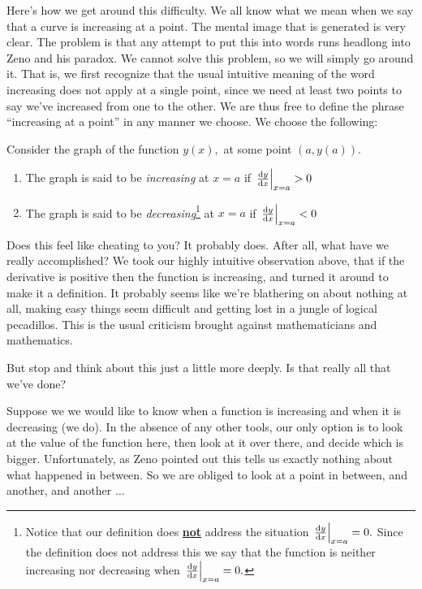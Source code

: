 Here's how we get around this difficulty. We all know what we mean
when we say that a curve is increasing at a point. The mental image
that is generated is very clear. The problem is that any attempt to
put this into words runs headlong into Zeno and his paradox. We cannot
solve this problem, so we will simply go around it. That is, we first
recognize that the usual intuitive meaning of the word increasing does
not apply at a single point, since we need at least two points to say
we've increased from one to the other.  We are thus free to define the
phrase ``increasing at a point'' in any manner we choose. We choose
the following:
\begin{definition}{}
  Consider the graph of the function $y(x),$ at some point $(a, y(a)).$
  \begin{enumerate}
  \item The graph is said to be \emph{increasing} at $x=a$ if $\left.{}\frac{\text{d}{y}}{\text{d}{x}}\right|_{x=a} > 0$
  \item The graph is said to be \emph{decreasing}\footnote{Notice that
      our definition does \underline{\bf{}not} address the situation
      $\left.{}\frac{\text{d}{y}}{\text{d}{x}}\right|_{x=a}=0.$ Since the definition does not address
      this we say that the function is neither increasing nor
      decreasing when $\left.{}\frac{\text{d}{y}}{\text{d}{x}}\right|_{x=a}=0.$ } at $x=a$ if
    $\left.{}\frac{\text{d}{y}}{\text{d}{x}}\right|_{x=a} < 0$
  \end{enumerate}
  \label{def:first-deriv-test}
\end{definition}


Does this feel like cheating to you? It probably does.  After all,
what have we really accomplished? We took our highly intuitive
observation above, that if the derivative is positive then the
function is increasing, and turned it around to make it a
definition. It probably seems like we're blathering on about nothing
at all, making easy things seem difficult and getting lost in a jungle
of logical pecadillos. This is the usual criticism brought against
mathematicians and mathematics.

But stop and think about this just a little more deeply. Is that
really all that we've done?

Suppose we we would like to know when a function is increasing and
when it is decreasing (we do). In the absence of any other tools,
our only option is to look at the value of the function here, then
look at it over there, and decide which is bigger. Unfortunately, as
Zeno pointed out this tells us exactly nothing about what happened in
between. So we are obliged to look at a point in between, and another,
and another $\ldots$

